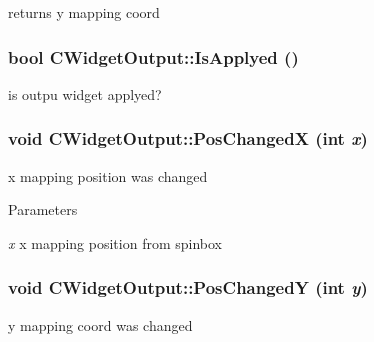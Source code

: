 \label{classCWidgetOutput_a255be0716b77039669bef07bb78c95b8}
returns y mapping coord \hypertarget{classCWidgetOutput_ada41e67db63edcb77452600ef0eaea9a}{
\subsubsection[{IsApplyed}]{\setlength{\rightskip}{0pt plus 5cm}bool CWidgetOutput::IsApplyed ()}}
\label{classCWidgetOutput_ada41e67db63edcb77452600ef0eaea9a}
is outpu widget applyed? \hypertarget{classCWidgetOutput_a49bf6287bc7ec9eb962cf22d261f0110}{
\subsubsection[{PosChangedX}]{\setlength{\rightskip}{0pt plus 5cm}void CWidgetOutput::PosChangedX (int {\em x})}}
\label{classCWidgetOutput_a49bf6287bc7ec9eb962cf22d261f0110}
x mapping position was changed


\begin{DoxyParams}{Parameters}
\item[{\em x}]x mapping position from spinbox \end{DoxyParams}
\hypertarget{classCWidgetOutput_a41c2d7f5f4dac75a4d41bf9ca807d838}{
\subsubsection[{PosChangedY}]{\setlength{\rightskip}{0pt plus 5cm}void CWidgetOutput::PosChangedY (int {\em y})}}
\label{classCWidgetOutput_a41c2d7f5f4dac75a4d41bf9ca807d838}
y mapping coord was changed


